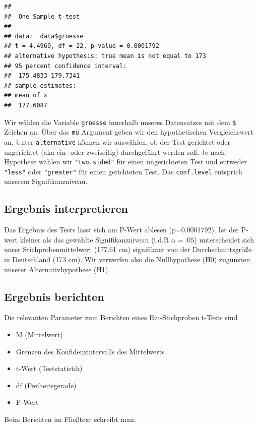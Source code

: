 \documentclass[
]{book}
\providecommand{\tightlist}{%
  \setlength{\itemsep}{0pt}\setlength{\parskip}{0pt}}
\begin{document}
\begin{verbatim}
## 
##  One Sample t-test
## 
## data:  data$groesse
## t = 4.4969, df = 22, p-value = 0.0001792
## alternative hypothesis: true mean is not equal to 173
## 95 percent confidence interval:
##  175.4833 179.7341
## sample estimates:
## mean of x 
##  177.6087
\end{verbatim}

Wir wählen die Variable \texttt{groesse} innerhalb unseres Datensatzes mit dem \texttt{\$} Zeichen an. Über das \texttt{mu} Argument geben wir den hypothetischen Vergleichswert an. Unter \texttt{alternative} können wir auswählen, ob der Test gerichtet oder ungerichtet (aka ein- oder zweiseitig) durchgeführt werden soll. Je nach Hypothese wählen wir \texttt{"two.sided"} für einen ungerichteten Test und entweder \texttt{"less"} oder \texttt{"greater"} für einen gerichteten Test. Das \texttt{conf.level} entsprich unserem Signifikanzniveau.

\subsection{Ergebnis interpretieren}\label{ergebnis-interpretieren}

Das Ergebnis des Tests lässt sich am P-Wert ablesen (p=0.0001792). Ist der P-wert kleiner als das gewählte Signifikanzniveau (i.d.R \(\alpha=.05\)) unterscheidet sich unser Stichprobenmittelwert (177.61 cm) signifikant von der Durchschnittsgröße in Deutschland (173 cm). Wir verwerfen also die Nullhypothese (H0) zugunsten unserer Alternativhypothese (H1).

\subsection{Ergebnis berichten}\label{ergebnis-berichten}

Die relevanten Parameter zum Berichten eines Ein-Stichproben t-Tests sind

\begin{itemize}
\tightlist
\item
  M (Mittelwert)
\item
  Grenzen des Konfidenzintervalls des Mittelwerts
\item
  t-Wert (Teststatistik)
\item
  df (Freiheitsgerade)
\item
  P-Wert
\end{itemize}

Beim Berichten im Fließtext schreibt man:
\end{document}
